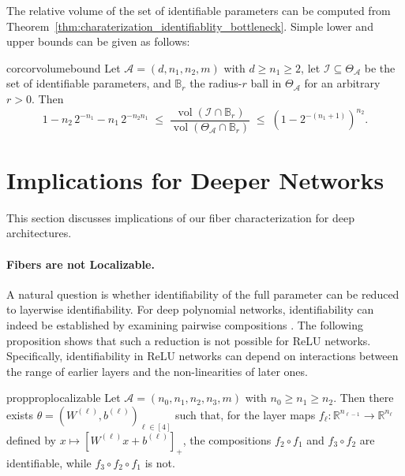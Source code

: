 \documentclass{article}
\theoremstyle{definition}
\newcommand{\R}{\mathbb{R}}
\newcommand{\architecture}{\mathcal{A}}
\newcommand{\paramspace}[1]{\Theta_{#1}}
\newcommand{\weights}[1]{W^{(#1)}}
\newcommand{\bias}[1]{b^{(#1)}}
\begin{document}
The relative volume of the set of identifiable parameters can be computed from Theorem~\ref{thm:charaterization_identifiablity_bottleneck}. 
Simple lower and upper bounds can be given as follows: 

\begin{restatable}{cor}{corvolumebound}
\label{cor:volume-bound}
Let $\architecture=(d,n_1,n_2,m)$ with 
$d\geq n_1 \geq 2$, 
let 
\(
\mathcal{I} \subseteq \paramspace{\architecture}
\)
be the set of identifiable parameters, 
and $\mathbb{B}_r$ the radius-$r$ ball in $\paramspace{\architecture}$ for an arbitrary $r>0$. 
Then  
\[
1 - n_2 \, 2^{-n_1}  - n_1 \, 2^{-n_2n_1}
\;\le\;
\frac{\operatorname{vol}(\mathcal{I} \cap \mathbb{B}_r)}{\operatorname{vol}(\paramspace{\architecture} \cap \mathbb{B}_r)}
\;\le\;
(1 - 2^{-(n_1+1)})^{n_2}. 
\]
\end{restatable} 


\section{Implications for Deeper Networks}
\label{sec:implications_for_deep_NNs}

This section discusses implications of our fiber characterization for deep architectures. 


\paragraph{Fibers are not Localizable.} 

A natural question is whether identifiability of the full parameter can be reduced to layerwise identifiability. 
For deep polynomial networks, identifiability can indeed be established by examining pairwise compositions \citep{usevich2025identifiabilitydeeppolynomialneural}. 
%
The following proposition shows that such a reduction is not possible for ReLU networks. 
Specifically, identifiability in ReLU networks can depend on interactions between the range of earlier layers and the non-linearities of later ones. 

\begin{restatable}{prop}{proplocalizable}
\label{prop:localizable}
    Let $\architecture=(n_0,n_1,n_2,n_3,m)$ with 
    $n_0\geq n_1\geq n_2$.  
    Then there exists $\theta = (\weights{\ell},\bias{\ell})_{\ell \in [4]}$ such that, for the layer maps $f_\ell \colon \R^{n_{\ell-1}} \to \R^{n_\ell}$ defined by $x \mapsto \left[\weights{\ell}x+\bias{\ell}\right]_+$, the compositions $f_2 \circ f_1$ and $f_3 \circ f_2$ are identifiable, 
    while $f_3 \circ f_2 \circ f_1$ is not. 
\end{restatable} 
\end{document}
